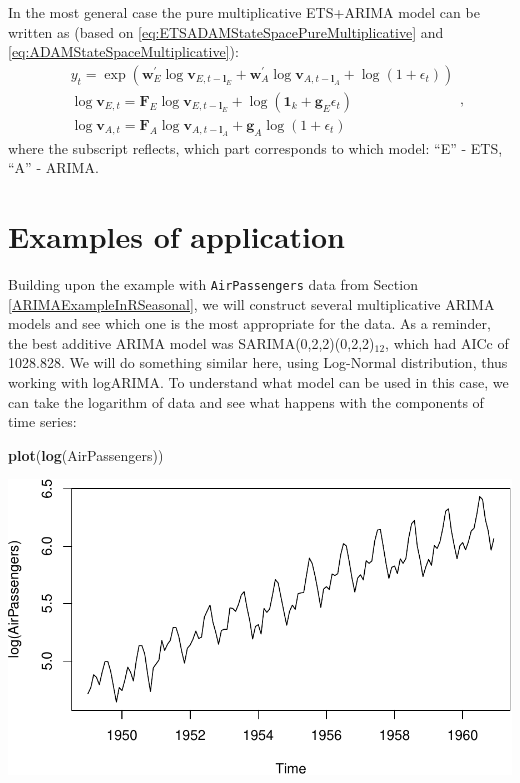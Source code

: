 \documentclass[]{book}
\newenvironment{Shaded}{\begin{snugshade}}{\end{snugshade}}
\newcommand{\KeywordTok}[1]{\textcolor[rgb]{0.13,0.29,0.53}{\textbf{#1}}}
\newcommand{\NormalTok}[1]{#1}
\theoremstyle{definition}
\theoremstyle{definition}
\theoremstyle{definition}
\theoremstyle{definition}
\theoremstyle{remark}
\begin{document}
In the most general case the pure multiplicative ETS+ARIMA model can be written as (based on \eqref{eq:ETSADAMStateSpacePureMultiplicative} and \eqref{eq:ADAMStateSpaceMultiplicative}):
\begin{equation}
  \begin{aligned}
    &{y}_{t} = \exp \left( \mathbf{w}_{E}^\prime \log \mathbf{v}_{E,t-\mathbf{l}_E} + \mathbf{w}_{A}^\prime \log \mathbf{v}_{A,t-\mathbf{l}_A} + \log(1+\epsilon_t) \right) \\
        &\log \mathbf{v}_{E,t} = \mathbf{F}_{E} \log \mathbf{v}_{E,t-\mathbf{l}_E} + \log(\mathbf{1}_k + \mathbf{g}_E \epsilon_t) \\
    &\log \mathbf{v}_{A,t} = \mathbf{F}_{A} \log \mathbf{v}_{A,t-\mathbf{l}_A} + \mathbf{g}_A \log(1+\epsilon_t)
  \end{aligned} ,
  \label{eq:ADAMETSARIMA}
\end{equation}
where the subscript reflects, which part corresponds to which model: ``E'' - ETS, ``A'' - ARIMA.

\hypertarget{ADAMARIMAExamples}{%
\section{Examples of application}\label{ADAMARIMAExamples}}

Building upon the example with \texttt{AirPassengers} data from Section \ref{ARIMAExampleInRSeasonal}, we will construct several multiplicative ARIMA models and see which one is the most appropriate for the data. As a reminder, the best additive ARIMA model was SARIMA(0,2,2)(0,2,2)\(_{12}\), which had AICc of 1028.828. We will do something similar here, using Log-Normal distribution, thus working with logARIMA. To understand what model can be used in this case, we can take the logarithm of data and see what happens with the components of time series:

\begin{Shaded}
\begin{Highlighting}[]
\KeywordTok{plot}\NormalTok{(}\KeywordTok{log}\NormalTok{(AirPassengers))}
\end{Highlighting}
\end{Shaded}

\includegraphics{Svetunkov--2022----ADAM_files/figure-latex/unnamed-chunk-49-1.pdf}
\end{document}
